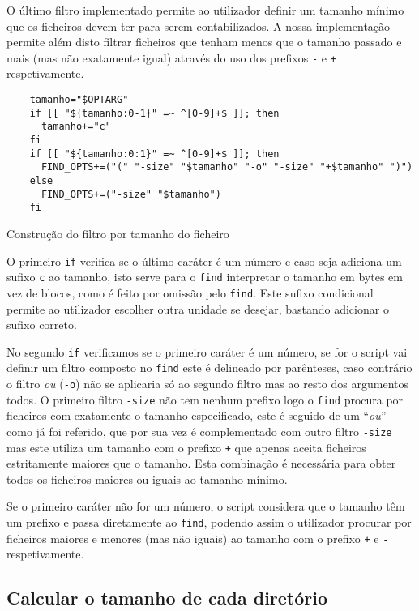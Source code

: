O último filtro implementado permite ao utilizador definir um tamanho mínimo que
os ficheiros devem ter para serem contabilizados. A nossa implementação permite
além disto filtrar ficheiros que tenham menos que o tamanho passado e mais (mas
não exatamente igual) através do uso dos prefixos \Verb|-| e \Verb|+|
respetivamente.

\begin{listing}[H]
	\centering
	\begin{verbatim}
    tamanho="$OPTARG"
    if [[ "${tamanho:0-1}" =~ ^[0-9]+$ ]]; then
      tamanho+="c"
    fi
    if [[ "${tamanho:0:1}" =~ ^[0-9]+$ ]]; then
      FIND_OPTS+=("(" "-size" "$tamanho" "-o" "-size" "+$tamanho" ")")
    else
      FIND_OPTS+=("-size" "$tamanho")
    fi
  \end{verbatim}
	\caption{Construção do filtro por tamanho do ficheiro}
\end{listing}

O primeiro \Verb|if| verifica se o último caráter é um número e caso seja
adiciona um sufixo \Verb|c| ao tamanho, isto serve para o \Verb|find|
interpretar o tamanho em bytes em vez de blocos, como é feito por omissão pelo
\Verb|find|. Este sufixo condicional permite ao utilizador escolher outra
unidade se desejar, bastando adicionar o sufixo correto.

No segundo \Verb|if| verificamos se o primeiro caráter é um número, se for o
script vai definir um filtro composto no \Verb|find| este é delineado por
parênteses, caso contrário o filtro \emph{ou} (\Verb|-o|) não se aplicaria só ao
segundo filtro mas ao resto dos argumentos todos. O primeiro filtro \Verb|-size|
não tem nenhum prefixo logo o \Verb|find| procura por ficheiros com exatamente o
tamanho especificado, este é seguido de um \enquote{\emph{ou}} como já foi
referido, que por sua vez é complementado com outro filtro \Verb|-size| mas
este utiliza um tamanho com o prefixo \Verb|+| que apenas aceita ficheiros
estritamente maiores que o tamanho.
Esta combinação é necessária para obter todos os ficheiros maiores ou iguais ao
tamanho mínimo.

Se o primeiro caráter não for um número, o script considera que o tamanho têm um
prefixo e passa diretamente ao \Verb|find|, podendo assim o utilizador procurar
por ficheiros maiores e menores (mas não iguais) ao tamanho com o prefixo
\Verb|+| e \Verb|-| respetivamente.

\subsection{Calcular o tamanho de cada diretório}
\label{sec:implementation_calculate_size}

